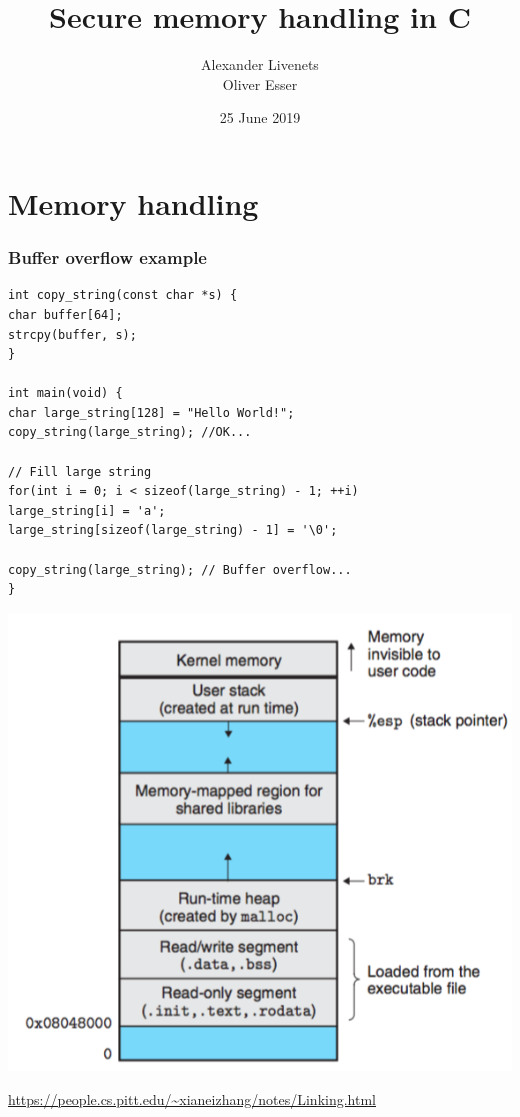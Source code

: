 \documentclass[usenames,dvipsnames]{beamer}
\title{Secure memory handling in C}
\subtitle{}
\author{Alexander Livenets \\ Oliver Esser}
\institute{}
\date{25 June 2019}
\begin{document}


\begin{frame}
\titlepage
\end{frame}

\section{Memory handling}
\begin{frame}[fragile]
\frametitle{Buffer overflow example}
\tiny
\begin{verbatim}
int copy_string(const char *s) {
char buffer[64];
strcpy(buffer, s);
}

int main(void) {
char large_string[128] = "Hello World!";
copy_string(large_string); //OK...

// Fill large string
for(int i = 0; i < sizeof(large_string) - 1; ++i)
large_string[i] = 'a';
large_string[sizeof(large_string) - 1] = '\0';

copy_string(large_string); // Buffer overflow...
}
\end{verbatim}
\end{frame}

\begin{frame}
\centering
\includegraphics[scale=0.35]{linux_mem.png}

\tiny{\url{https://people.cs.pitt.edu/~xianeizhang/notes/Linking.html}}
\end{frame}
\end{document}
